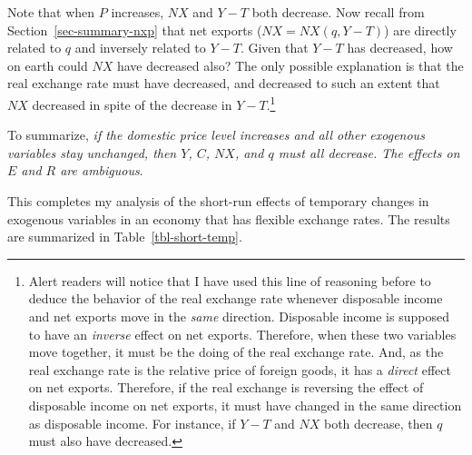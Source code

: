 \documentclass[
  letterpaper,
]{book}
\theoremstyle{plain}
\theoremstyle{remark}
\begin{document}
Note that when \(P\) increases, \(NX\) and \(Y-T\) both decrease. Now
recall from Section~\ref{sec-summary-nxp} that net exports
(\(NX=NX(q, Y-T)\)) are directly related to \(q\) and inversely related
to \(Y-T\). Given that \(Y-T\) has decreased, how on earth could \(NX\)
have decreased also? The only possible explanation is that the real
exchange rate must have decreased, and decreased to such an extent that
\(NX\) decreased in spite of the decrease in \(Y-T\).\footnote{Alert
  readers will notice that I have used this line of reasoning before to
  deduce the behavior of the real exchange rate whenever disposable
  income and net exports move in the \emph{same} direction. Disposable
  income is supposed to have an \emph{inverse} effect on net exports.
  Therefore, when these two variables move together, it must be the
  doing of the real exchange rate. And, as the real exchange rate is the
  relative price of foreign goods, it has a \emph{direct} effect on net
  exports. Therefore, if the real exchange is reversing the effect of
  disposable income on net exports, it must have changed in the same
  direction as disposable income. For instance, if \(Y-T\) and \(NX\)
  both decrease, then \(q\) must also have decreased.}

To summarize, \emph{if the domestic price level increases and all other
exogenous variables stay unchanged, then \(Y\), \(C\), \(NX\), and \(q\)
must all decrease. The effects on \(E\) and \(R\) are ambiguous}.

This completes my analysis of the short-run effects of temporary changes
in exogenous variables in an economy that has flexible exchange rates.
The results are summarized in Table~\ref{tbl-short-temp}.
\end{document}
